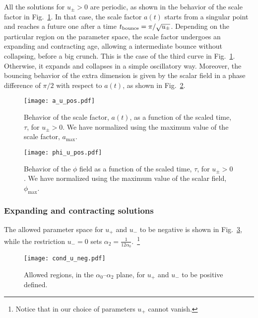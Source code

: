 \documentclass[aps,prd,12pt,superscriptaddress,showpacs,showkeys,longbibliography,reprint,nofootinbib]{revtex4-1}
\begin{document}
All the solutions for $u_\pm>0$ are periodic, as shown in the behavior of the scale factor in Fig.~\ref{a_u_pos}. In that case, the scale factor $a(t)$ starts from a singular point and reaches a future one after a time $t_{\rm bounce}=\pi/\sqrt{u_\pm}$. Depending on the particular region on the parameter space, the scale factor undergoes an expanding and contracting age, allowing a intermediate bounce without collapsing, before a big crunch. This is the case of the third curve in Fig.~\ref{a_u_pos}. Otherwise, it expands and collapses in a {simple} oscillatory way.
Moreover, the bouncing behavior of the extra dimension is given by the scalar field in a phase difference of $\pi/2$ with respect to $a(t)$, as shown in Fig.~\ref{phi_u_pos}. %
\begin{figure}[H]
  \texttt{[image: a\_u\_pos.pdf]}
  \caption{Behavior of the scale factor, \(a(t)\), as a function of the scaled time, $\tau$, for $u_\pm > 0$. We have normalized using the maximum value of the scale factor, $a_{\mathrm{max}}$.}
  \label{a_u_pos}
\end{figure}
\begin{figure}[H]
  \texttt{[image: phi\_u\_pos.pdf]}
  \caption{Behavior of the $\phi$ field as a function of the scaled time, $\tau$, for $u_\pm > 0$. We have normalized using the maximum value of the scalar field, $\phi_{\mathrm{max}}$.}
  \label{phi_u_pos}
\end{figure}

\subsubsection{Expanding and contracting solutions}

The allowed parameter space for $u_+$ and $u_-$ to be negative is shown in Fig.~\ref{cond_u_neg}, while the restriction $u_- = 0$ sets $\alpha_2 = \tfrac{1}{12 \alpha_0}$.~\footnote{Notice that in our choice of parameters $u_+$ cannot vanish.}

\begin{figure}[H]
  \texttt{[image: cond\_u\_neg.pdf]}
  \caption{Allowed regions, in the $\alpha_0$--$\alpha_2$ plane, for $u_+$ and $u_-$ to be positive defined.}
  \label{cond_u_neg}  
\end{figure}
\end{document}
